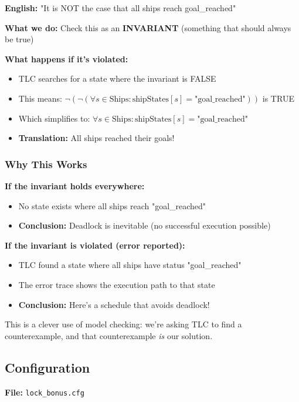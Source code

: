 \documentclass[12pt,a4paper]{article}
\begin{document}
\textbf{English:} "It is NOT the case that all ships reach goal\_reached"

\textbf{What we do:} Check this as an \textbf{INVARIANT} (something that should always be true)

\textbf{What happens if it's violated:}
\begin{itemize}
    \item TLC searches for a state where the invariant is FALSE
    \item This means: $\neg(\neg(\forall s \in \text{Ships}: \text{shipStates}[s] = \text{"goal\_reached"}))$ is TRUE
    \item Which simplifies to: $\forall s \in \text{Ships}: \text{shipStates}[s] = \text{"goal\_reached"}$
    \item \textbf{Translation:} All ships reached their goals!
\end{itemize}

\subsubsection{Why This Works}

\textbf{If the invariant holds everywhere:}
\begin{itemize}
    \item No state exists where all ships reach "goal\_reached"  
    \item \textbf{Conclusion:} Deadlock is inevitable (no successful execution possible)
\end{itemize}

\textbf{If the invariant is violated (error reported):}
\begin{itemize}
    \item TLC found a state where all ships have status "goal\_reached"
    \item The error trace shows the execution path to that state
    \item \textbf{Conclusion:} Here's a schedule that avoids deadlock! \checkmark
\end{itemize}

This is a clever use of model checking: we're asking TLC to find a counterexample, and that counterexample \textit{is} our solution.

\subsection{Configuration}

\textbf{File:} \texttt{lock\_bonus.cfg}
\end{document}
